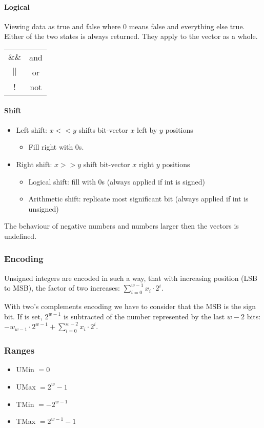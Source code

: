 \paragraph{Logical}
Viewing data as true and false where $0$ means false and everything else true. Either of the two states is always returned. They apply to the vector as a whole.

\begin{tabular}{c | c}
    $\&\&$ & and\\
    $||$ & or\\
    $!$ & not
\end{tabular}

\paragraph{Shift}
\begin{itemize}
    \item Left shift: $x << y$ shifts bit-vector $x$ left by $y$ positions
        \begin{itemize}
            \item Fill right with $0$s.
        \end{itemize}
    \item Right shift: $x >> y$ shift bit-vector $x$ right $y$ positions
        \begin{itemize}
            \item Logical shift: fill with $0$s (always applied if int is signed)
            \item Arithmetic shift: replicate most significant bit (always applied if int is unsigned)
        \end{itemize}
\end{itemize}

The behaviour of negative numbers and numbers larger then the vectors is undefined.

\subsubsection{Encoding}
Unsigned integers are encoded in such a way, that with increasing position (LSB to MSB), the factor of two increases: $\sum_{i=0}^{w-1} x_i \cdot 2^i$.

With two's complements encoding we have to consider that the MSB is the sign bit. If is set, $2^{w-1}$ is subtracted of the number represented by the last $w-2$ bits: $-w_{w - 1} \cdot 2^{w - 1} + \sum_{i=0}^{w - 2} x_i \cdot 2^i$.

\subsubsection{Ranges}
\begin{itemize}
    \item UMin $= 0$
    \item UMax $= 2^w -1$
    \item TMin $=-2^{w - 1}$
    \item TMax $=2^{w-1} - 1$
\end{itemize}

